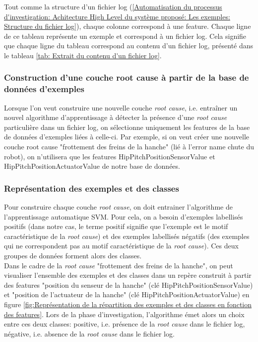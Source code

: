 Tout comme la structure d'un fichier log (\ref{Automatisation du processus d'investigation: Achitecture High Level du système proposé: Les exemples: Structure du fichier log}), chaque colonne correspond à une feature. Chaque ligne de ce tableau représente un exemple et correspond à un fichier log. Cela signifie que chaque ligne du tableau correspond au contenu d'un fichier log, présenté dans le tableau \ref {tab: Extrait du contenu d'un fichier log}.

\subsubsection{Construction d'une couche root cause à partir de la base de données d'exemples}
\label{Automatisation du processus d'investigation: Achitecture High Level du système proposé: Les exemples: Construction d'une couche root cause à partir de la base de données d'exemples}
Lorsque l'on veut construire une nouvelle couche \emph{root cause}, i.e. entraîner un nouvel algorithme d'apprentissage à détecter la présence d'une \emph{root cause} particulière dans un fichier log, on sélectionne uniquement les features de la base de données d'exemples liées à celle-ci. Par exemple, si on veut créer une nouvelle couche root cause "frottement des freins de la hanche" (lié à l'error name chute du robot), on n'utilisera que les features HipPitchPositionSensorValue et HipPitchPositionActuatorValue de notre base de données.

\subsubsection{Représentation des exemples et des classes}
\label{Automatisation du processus d'investigation: Achitecture High Level du système proposé: Les exemples: Représentation des exemples et des classes}
Pour construire chaque couche \emph{root cause}, on doit entrainer l'algorithme de l'apprentissage automatique SVM. Pour cela, on a besoin d'exemples labellisés positifs (dans notre cas, le terme positif signifie que l'exemple est le motif caractéristique de la \emph{root cause}) et des exemples labellisés négatifs (des exemples qui ne correspondent pas au motif caractéristique de la \emph{root cause}). Ces deux groupes de données forment alors des classes. \\
Dans le cadre de la \emph{root cause} "frottement des freins de la hanche", on peut visualiser l'ensemble des exemples et des classes dans un repère construit à partir des features "position du senseur de la hanche" (clé HipPitchPositionSensorValue) et "position de l'actuateur de la hanche" (clé HipPitchPositionActuatorValue) en figure \ref{fig:Représentation de la répartition des exemples et des classes en fonction des features}. Lors de la phase d'investigation, l'algorithme émet alors un choix entre ces deux classes: positive, i.e. présence de la \emph{root cause} dans le fichier log, négative, i.e. absence de la \emph{root cause} dans le fichier log. 

